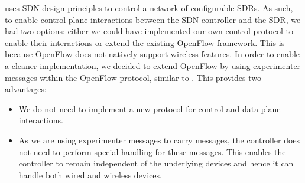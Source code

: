 \crossflow uses SDN design principles to control a network of configurable SDRs. As such, to enable control plane interactions between the SDN controller and the SDR, we had two options: either we could have implemented our own control protocol to enable their interactions or extend the existing OpenFlow \cite{openflow} framework. This is because OpenFlow does not natively support wireless features. In order to enable a cleaner implementation, we decided to extend OpenFlow by using experimenter messages within the OpenFlow protocol, similar to \aetherflow. This provides two advantages:
\begin{itemize}
\item We do not need to implement a new protocol for control and data plane interactions.
\item As we are using experimenter messages to carry \crossflow messages, the controller does not need to perform special handling for these messages. This enables the controller to remain independent of the underlying devices and hence it can handle both wired and wireless devices. 
\end{itemize} 

